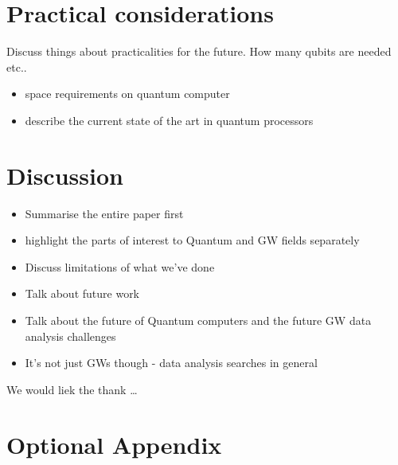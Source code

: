 \documentclass[aps,prd,nofootinbib,twocolumn,reprint,superscriptaddress,showpacs,showkeys,longbibliography]{revtex4-1}
\begin{document}
\section{Practical considerations}\label{sec:intro}

Discuss things about practicalities for the future. How many qubits are needed
etc.. 

\begin{itemize}
\item space requirements on quantum computer
\item describe the current state of the art in quantum processors
\end{itemize}

\section{Discussion}\label{sec:discussion}

\begin{itemize}
\item Summarise the entire paper first
\item highlight the parts of interest to Quantum and GW fields separately
\item Discuss limitations of what we've done
\item Talk about future work
\item Talk about the future of Quantum computers and the future GW data
analysis challenges
\item It's not just GWs though - data analysis searches in general
\end{itemize}

\begin{acknowledgments}
We would liek the thank \ldots
\end{acknowledgments}


\appendix

\section{Optional Appendix\label{sec:appendix}}



\end{document}
